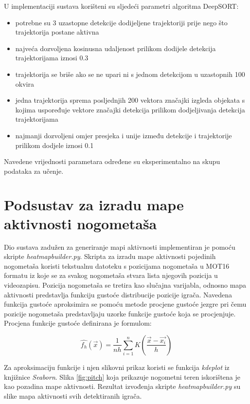 \documentclass[times, utf8, seminar, numeric]{fer}
\begin{document}
U implementaciji sustava korišteni su sljedeći parametri algoritma DeepSORT: 
\begin{itemize}
	\item potrebne su 3 uzastopne detekcije dodijeljene trajektoriji prije nego što trajektorija postane aktivna
	\item najveća dozvoljena kosinusna udaljenost prilikom dodijele detekcija trajektorijama iznosi 0.3
	\item trajektorija se briše ako se ne upari ni s jednom detekcijom u uzastopnih 100 okvira
	\item jedna trajektorija sprema posljednjih 200 vektora značajki izgleda objekata s kojima uspoređuje vektore značajki detekcija prilikom dodjeljivanja detekcija trajektorijama
	\item najmanji dozvoljeni omjer presjeka i unije između detekcije i trajektorije prilikom dodjele iznosi 0.1
\end{itemize}

Navedene vrijednosti parametara određene su eksperimentalno na skupu podataka za učenje.


\section{Podsustav za izradu mape aktivnosti nogometaša}

Dio sustava zadužen za generiranje mapi aktivnosti implementiran je pomoću skripte \textit{heatmap\textunderscore builder.py}.
Skripta za izradu mape aktivnosti pojedinih nogometaša koristi tekstualnu datoteku s pozicijama nogometaša u MOT16 formatu iz koje se za svakog nogometaša stvara lista njegovih pozicija u videozapisu. 
Pozicija nogometaša se tretira kao slučajna varijabla, odnosno mapa aktivnosti predstavlja funkciju gustoće distribucije pozicije igrača. 
Navedena funkcija gustoće aproksimira se pomoću metode procjene gustoće jezgre pri čemu pozicije nogometaša predstavljaju uzorke funkcije gustoće koja se procjenjuje. 
Procjena funkcije gustoće definirana je formulom:

\[\hat{f_h}(\vec{x}) = \frac{1}{nh} \sum_{i=1}^{n} K( \frac{\vec{x} - \vec{x_i}}{h}) \]

Za aproksimaciju funkcije i njen slikovni prikaz koristi se funkcija \textit{kdeplot} iz knjižnice \textit{Seaborn}. Slika \ref{fig:pitch} koja prikazuje nogometni teren iskorištena je kao pozadina mape aktivnosti. 
Rezultat izvođenja skripte \textit{heatmap\textunderscore builder.py} su slike mapa aktivnosti svih detektiranih igrača.
\end{document}
